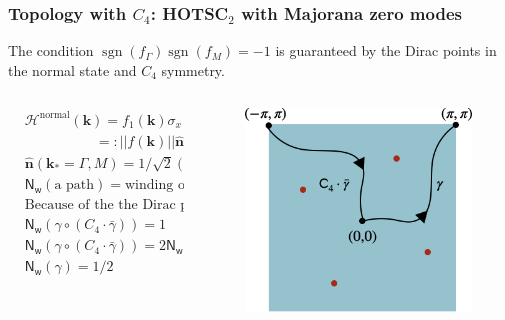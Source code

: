 \documentclass{beamer}
\DeclareMathOperator{\sgn}{sgn}
\renewcommand{\(}{\left(}
\renewcommand{\)}{\right)}
\renewcommand{\[}{\left[}
\renewcommand{\]}{\right]}
\begin{document}
\begin{frame}
    \frametitle{Topology with $C_4$: HOTSC$_2$ with Majorana zero modes}
    The condition $\sgn(f_{\Gamma}) \sgn(f_{M}) = -1$ is guaranteed by the Dirac points in the normal state and $C_4$ symmetry. \pause
    \begin{columns} 
        \begin{column}{0.6\textwidth}
            \centering
            \begin{align*}
                &\mathcal{H}^{\text{normal}}(\bm k) = f_1(\bm k) \sigma_x + f_2(\bm k) \sigma_z \\
                &\qquad \qquad \quad =: ||f(\bm k)||\hat{\bm{n}}(\bm k)\cdot\bm{\sigma} \\
                & \hat{\bm{n}}(\bm k_* = \Gamma, M) = 1/\sqrt{2}(e_x + e_z) \\
                &\mathsf{N}_{\mathsf{w}}\left(\text{a path}\right) = \text{winding of}\ \hat{\bm n}(\bm k) \\
                &\text{Because of the the Dirac point:} \\
                &\mathsf{N}_{\mathsf{w}}\left(\gamma\circ (C_4\cdot \bar{\gamma})\right)= 1\\
                &\mathsf{N}_{\mathsf{w}}\left(\gamma\circ (C_4\cdot \bar{\gamma})\right)=2\mathsf{N}_{\mathsf{w}}(\gamma) \\
                &\mathsf{N}_{\mathsf{w}}(\gamma) = 1/2
                \end{align*}
        \end{column}
        \begin{column}{0.4\textwidth}
            \begin{figure}[]
                \includegraphics[scale=0.25]{C4_path.png}
            \end{figure}
        \end{column}
    \end{columns}
\end{frame}
\end{document}
